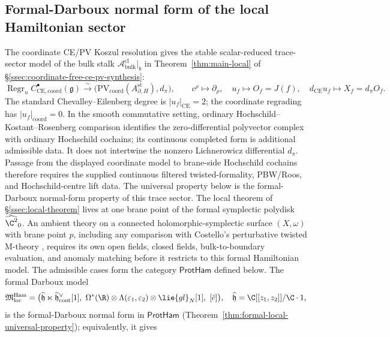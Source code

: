 \subsection{Formal-Darboux normal form of the local Hamiltonian sector}\label{ssec:twistedM-universality}

The coordinate CE/PV Koszul resolution gives the stable
scalar-reduced trace-sector model of the bulk stalk
\(\mathcal A^{\mathrm{cl}}_{\mathrm{bulk}}|_b\) in
Theorem~\ref{thm:main-local} of
\S\ref{ssec:coordinate-free-ce-pv-synthesis}:
\[
  \operatorname{Regr}_u
  C^\bullet_{\mathrm{CE},\mathrm{coord}}(\mathfrak g)
  \xrightarrow{\sim}
  \bigl(\mathrm{PV}_{\mathrm{coord}}
    (A_{\partial,H}^{\mathrm{st}}),d_\pi\bigr),
  \qquad
  c^\rho\mapsto\partial_\rho,
  \quad u_f\mapsto O_f=J(f),
  \quad d_{\mathrm{CE}}u_f\mapsto X_f=d_\pi O_f.
\]
The standard Chevalley--Eilenberg degree is
\(|u_f|_{\mathrm{CE}}=2\); the coordinate regrading has
\(|u_f|_{\mathrm{coord}}=0\).  In the smooth commutative setting,
ordinary Hochschild--Kostant--Rosenberg comparison identifies the
zero-differential polyvector complex with ordinary Hochschild cochains;
its continuous completed form is additional admissible data.  It does not
intertwine the nonzero Lichnerowicz differential \(d_\pi\).  Passage from
the displayed coordinate model to brane-side Hochschild cochains
therefore requires the supplied continuous filtered twisted-formality,
PBW/Roos, and Hochschild-centre lift data.  The universal property below
is the formal-Darboux normal-form property of this trace sector.
The local theorem of \S\ref{ssec:local-theorem} lives at one brane
point of the formal symplectic polydisk \(\widehat{\C^2}_0\).  An
ambient theory on a connected holomorphic-symplectic surface
\((X,\omega)\) with brane point \(p\), including any comparison with
Costello's perturbative twisted M-theory \cite{costello-twistedM},
requires its own open fields, closed fields, bulk-to-boundary
evaluation, and anomaly matching before it restricts to this formal
Hamiltonian model.  The admissible cases form the category
\(\mathsf{ProtHam}\) defined below.  The formal Darboux model
\[
  \mathfrak M^{\mathrm{Ham}}_{\mathrm{loc}}
   =
  \bigl(
    \widehat{\mathfrak h}\ltimes
    \widehat{\mathfrak h}^\vee_{\mathrm{cont}}[1],\
    \Omega^*(\R)\otimes\Lambda(\varepsilon_1,\varepsilon_2)
      \otimes\lie{gl}_N[1],\
    [\bar c]
  \bigr),
  \quad
  \widehat{\mathfrak h}=\C[[z_1,z_2]]/\C\cdot1,
\]
is the formal-Darboux normal form in \(\mathsf{ProtHam}\)
(Theorem~\ref{thm:formal-local-universal-property}); equivalently, it gives
